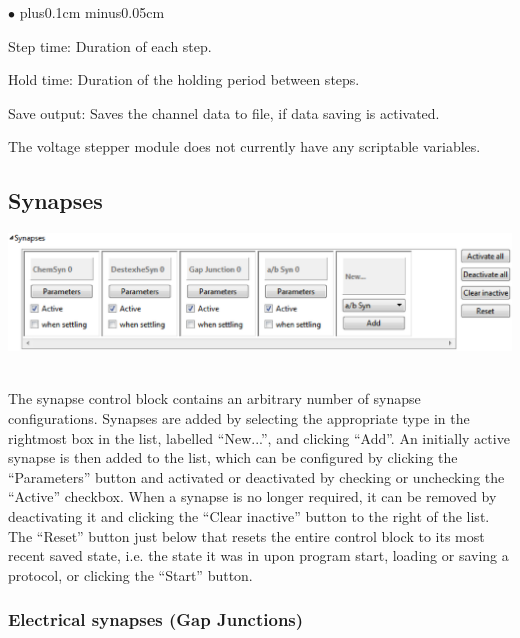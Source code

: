 \documentclass{article}
\newenvironment{myitem}{\begin{list}{$\bullet$}{\setlength{\leftmargin}{1.1em}
\itemsep0.1cm plus0.1cm minus0.05cm
\listparindent0cm
\addtolength{\labelsep}{0.5\labelsep}
\setlength{\labelwidth}{0.8em}
\setlength{\leftmargin}{\labelwidth}
\addtolength{\leftmargin}{\labelsep}
}}{\end{list}}
\begin{document}
\begin{myitem}
	\item Step time: Duration of each step.
	\item Hold time: Duration of the holding period between steps.
	\item Save output: Saves the channel data to file, if data saving is activated.
\end{myitem}
The voltage stepper module does not currently have any scriptable variables.


\subsection{Synapses}

\noindent
\parbox{\textwidth}{
	\includegraphics[scale=0.5]{synapseBlock}
} \\[0.2cm]

The synapse control block contains an arbitrary number of synapse configurations.
Synapses are added by selecting the appropriate type in the rightmost box in the
list, labelled ``New...'', and clicking ``Add''. An initially active synapse is
then added to the list, which can be configured by clicking the ``Parameters'' button and
activated or deactivated by checking or unchecking the ``Active'' checkbox. When a synapse is no
longer required, it can be removed by deactivating it and clicking the
``Clear inactive'' button to the right of the list. The ``Reset'' button just below that
resets the entire control block to its most recent saved state, i.e. the state it was in upon
program start, loading or saving a protocol, or clicking the ``Start'' button.

\subsubsection{Electrical synapses (Gap Junctions)}
\end{document}
